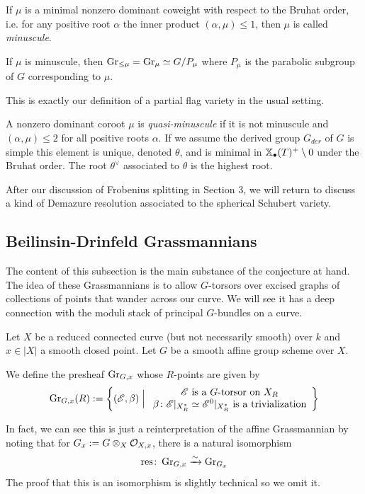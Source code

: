 \documentclass[12pt]{article}
\begin{document}
If $\mu$ is a minimal nonzero dominant coweight with respect to the Bruhat order, i.e. for any positive root $\alpha$ the inner product $(\alpha, \mu) \leq 1$, then $\mu$ is called \textit{minuscule}.
\begin{lem}
    If $\mu$ is minuscule, then $\operatorname{Gr}_{\leq \mu} = \operatorname{Gr}_{ \mu} \simeq G/P_{\mu}$ where $P_{\mu}$ is the parabolic subgroup of $G$ corresponding to $\mu$.
\end{lem}
This is exactly our definition of a partial flag variety in the usual setting. 

A nonzero dominant coroot $\mu$ is \textit{quasi-minuscule} if it is not minuscule and $(\alpha, \mu) \leq 2$ for all positive roots $\alpha$. If we assume the derived group $G_{der}$ of $G$ is simple this element is unique, denoted $\theta$, and is minimal in $\mathbb{X}_{\bullet}(T)^+ \setminus 0$ under the Bruhat order. The root $\theta^{\vee}$ associated to $\theta$ is the highest root. 

After our discussion of Frobenius splitting in Section 3, we will return to discuss a kind of Demazure resolution associated to the spherical Schubert variety.

\subsection{Beilinsin-Drinfeld Grassmannians}

The content of this subsection is the main substance of the conjecture at hand. The idea of these Grassmannians is to allow $G$-torsors over excised graphs of collections of points that wander across our curve. We will see it has a deep connection with the moduli stack of principal $G$-bundles on a curve. 

Let $X$ be a reduced connected curve (but not necessarily smooth) over $k$ and $x \in |X|$ a smooth closed point. Let $G$ be a smooth affine group scheme over $X$.
\begin{defn}
    We define the presheaf $\operatorname{Gr}_{G,x}$ whose $R$-points are given by
    \[\operatorname{Gr}_{G,x}(R) := \left\{(\mathscr{E},\beta) \;\Big\vert\; \begin{array}{c}
        \mathscr{E} \text{ is a } G\text{-torsor on } X_R \\
        \beta \colon \mathscr{E}\vert_{X_R^*} \simeq \mathscr{E}^0\vert_{X_R^*} \text{ is a trivialization} 
    \end{array}\right\}\]
\end{defn}
In fact, we can see this is just a reinterpretation of the affine Grassmannian by noting that for $G_x := G \otimes_X \mathcal{O}_{X,x}$, there is a natural isomorphism
\begin{equation}\label{resiso}
    \text{res} \colon \operatorname{Gr}_{G,x} \xrightarrow{ \sim } \operatorname{Gr}_{G_x}
\end{equation}
The proof that this is an isomorphism is slightly technical so we omit it.
\end{document}
